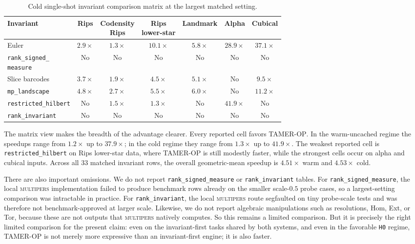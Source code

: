\documentclass[11pt]{article}
\newcommand{\TAMER}{\textsc{TAMER-OP}}
\newcommand{\multipers}{\textsc{multipers}}
\theoremstyle{definition}
\theoremstyle{remark}
\begin{document}
\begin{table}[t]
\centering
\scriptsize
\setlength{\tabcolsep}{5pt}
\begin{tabular}{|l|c|c|c|c|c|c|}
\hline
Invariant & Rips & \shortstack{Codensity\\Rips} & \shortstack{Rips\\lower-star} & Landmark & Alpha & Cubical \\
\hline
Euler & \(2.9\times\) & \(1.3\times\) & \(10.1\times\) & \(5.8\times\) & \(28.9\times\) & \(37.1\times\) \\
\shortstack[l]{\texttt{rank\_signed\_}\\\texttt{measure}} & No & No & No & No & No & No \\
Slice barcodes & \(3.7\times\) & \(1.9\times\) & \(4.5\times\) & \(5.1\times\) & No & \(9.5\times\) \\
\texttt{mp\_landscape} & \(4.8\times\) & \(2.7\times\) & \(5.5\times\) & \(6.0\times\) & No & \(11.2\times\) \\
\texttt{restricted\_hilbert} & No & \(1.5\times\) & \(1.3\times\) & No & \(41.9\times\) & No \\
\texttt{rank\_invariant} & No & No & No & No & No & No \\
\hline
\end{tabular}
\caption{Cold single-shot invariant comparison matrix at the largest matched setting.}
\label{tab:bench-invariant-cold-matrix}
\end{table}

The matrix view makes the breadth of the advantage clearer.  Every reported cell favors \TAMER{}.  In the warm-uncached regime the speedups range from \(1.2\times\) up to \(37.9\times\); in the cold regime they range from \(1.3\times\) up to \(41.9\times\).  The weakest reported cell is \texttt{restricted\_hilbert} on Rips lower-star data, where \TAMER{} is still modestly faster, while the strongest cells occur on alpha and cubical inputs.  Across all \(33\) matched invariant rows, the overall geometric-mean speedup is \(4.51\times\) warm and \(4.53\times\) cold.

There are also important omissions.  We do not report \texttt{rank\_signed\_measure} or \texttt{rank\_invariant} tables.  For \texttt{rank\_signed\_measure}, the local \multipers{} implementation failed to produce benchmark rows already on the smaller scale-\(0.5\) probe cases, so a largest-setting comparison was intractable in practice.  For \texttt{rank\_invariant}, the local \multipers{} route segfaulted on tiny probe-scale tests and was therefore not benchmark-approved at larger scale.  Likewise, we do not report algebraic manipulations such as resolutions, Hom, Ext, or Tor, because these are not outputs that \multipers{} natively computes.  So this remains a limited comparison.  But it is precisely the right limited comparison for the present claim: even on the invariant-first tasks shared by both systems, and even in the favorable \texttt{H0} regime, \TAMER{} is not merely more expressive than an invariant-first engine; it is also faster.
\end{document}
